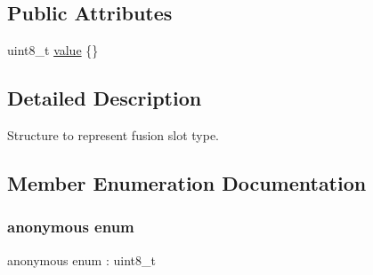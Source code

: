 \subsection*{Public Attributes}
\begin{DoxyCompactItemize}
\item 
uint8\+\_\+t \hyperlink{structmaf__perception__interface_1_1FusionParkingSlotType_ab1511698d8f69ce82e85a219240a7820}{value} \{\}
\end{DoxyCompactItemize}


\subsection{Detailed Description}
Structure to represent fusion slot type. 

\subsection{Member Enumeration Documentation}
\mbox{\label{structmaf__perception__interface_1_1FusionParkingSlotType_aae7208b0aece9e651b2aadf707bf3b9a}} 
\subsubsection{\texorpdfstring{anonymous enum}{anonymous enum}}
{\footnotesize\ttfamily anonymous enum \+: uint8\+\_\+t}

